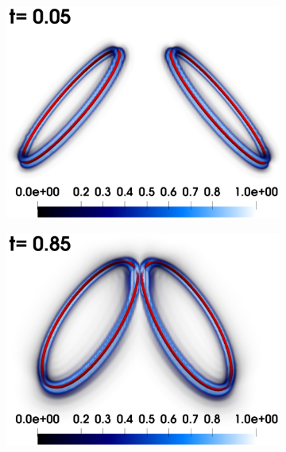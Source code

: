 \documentclass[9pt,twocolumn,twoside]{pnas-new}
\begin{document}
\begin{figure}
\begin{subfigure}[b]{0.24\textwidth}
		\includegraphics*[width=\textwidth]{snap-1.pdf}
	\end{subfigure}
	\begin{subfigure}[b]{0.24\textwidth}
		\centering
		\includegraphics*[width=\textwidth]{snap-2.pdf}
	\end{subfigure}
    \begin{subfigure}[b]{0.24\textwidth}
		\centering

\end{subfigure}
\end{figure}
\end{document}
